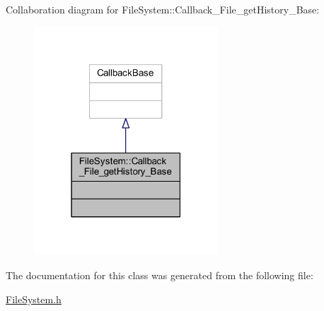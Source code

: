 Collaboration diagram for File\+System\+:\+:Callback\+\_\+\+File\+\_\+get\+History\+\_\+\+Base\+:
\nopagebreak
\begin{figure}[H]
\begin{center}
\leavevmode
\includegraphics[width=195pt]{class_file_system_1_1_callback___file__get_history___base__coll__graph}
\end{center}
\end{figure}


The documentation for this class was generated from the following file\+:\begin{DoxyCompactItemize}
\item 
\hyperlink{_file_system_8h}{File\+System.\+h}\end{DoxyCompactItemize}
